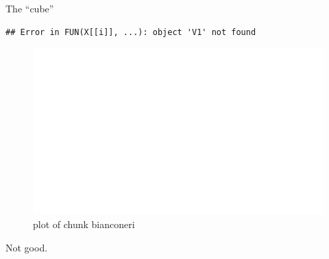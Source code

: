 \documentclass[ignorenonframetext,]{beamer}
\begin{document}
\begin{frame}[fragile]{The ``cube''}
\protect\hypertarget{the-cube}{}

\begin{verbatim}
## Error in FUN(X[[i]], ...): object 'V1' not found
\end{verbatim}

\begin{figure}
\centering
\includegraphics{figure/bianconeri-1.pdf}
\caption{plot of chunk bianconeri}
\end{figure}

Not good.

\end{frame}
\end{document}
